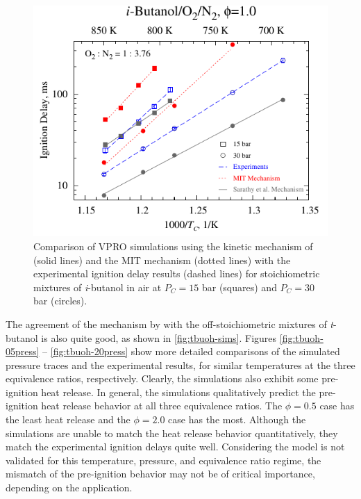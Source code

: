 \documentclass[12pt, letterpaper]{article}
\begin{document}
\begin{figure}
    \centering
    \includegraphics[width=12cm]{03-Butanol/buoh-mit}
    \caption{Comparison of VPRO simulations using the kinetic mechanism of
        \textcite{Sarathy2012} (solid lines) and the MIT mechanism
        \cite{Hansen2013,Merchant2013} (dotted lines) with the experimental
        ignition delay results (dashed lines) for stoichiometric mixtures of
        \textit{i}-butanol in air at $P_C=15$ bar (squares) and $P_C=30$ bar
        (circles).}
    \label{fig:buoh-mit}
\end{figure}

The agreement of the mechanism by \textcite{Sarathy2012} with the
off-stoichiometric mixtures of \textit{t}-butanol is also quite good, as shown
in \autoref{fig:tbuoh-sims}. Figures \ref{fig:tbuoh-05press}
-- \ref{fig:tbuoh-20press} show more detailed comparisons
of the simulated pressure traces and the experimental results, for similar
temperatures at the three equivalence ratios, respectively. Clearly, the
simulations also exhibit some pre-ignition heat release. In general, the
simulations qualitatively predict the pre-ignition heat release behavior at all
three equivalence ratios. The $\phi=0.5$ case has the least heat release and
the $\phi=2.0$ case has the most. Although the simulations are unable to match
the heat release behavior quantitatively, they match the experimental ignition
delays quite well. Considering the model is not validated for this temperature,
pressure, and equivalence ratio regime, the mismatch of the pre-ignition
behavior may not be of critical importance, depending on the application.
\end{document}
